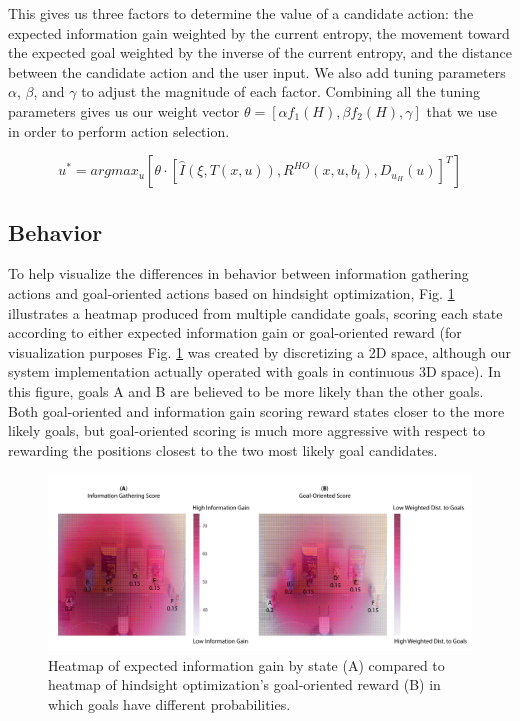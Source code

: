 \documentclass[conference]{IEEEtran}
\begin{document}
This gives us three factors to determine the value of a candidate action: the expected information gain weighted by the current entropy, the movement toward the expected goal weighted by the inverse of the current entropy, and the distance between the candidate action and the user input. We also add tuning parameters $\alpha$, $\beta$, and $\gamma$ to adjust the magnitude of each factor. Combining all the tuning parameters gives us our weight vector $\theta = [\alpha f_1(H), \beta f_2(H), \gamma]$ that we use in order to perform action selection.

\[
u^* = argmax_u [ \theta \cdot [\hat{I}(\xi, T(x,u)), R^{HO}(x,u,b_t), D_{u_H}(u)]^T ]
\]

\subsection{Behavior}

To help visualize the differences in behavior between information gathering actions and goal-oriented actions based on hindsight optimization, Fig. \ref{heatmap2} illustrates a heatmap produced from multiple candidate goals, scoring each state according to either expected information gain or goal-oriented reward (for visualization purposes Fig. \ref{heatmap2} was created by discretizing a 2D space, although our system implementation actually operated with goals in continuous 3D space). In this figure, goals A and B are believed to be more likely than the other goals. Both goal-oriented and information gain scoring reward states closer to the more likely goals, but goal-oriented scoring is much more aggressive with respect to rewarding the positions closest to the two most likely goal candidates.

\begin{figure}
\includegraphics[width=\columnwidth]{figures/Heatmap_Uneven_Belief.pdf}
\caption{Heatmap of expected information gain by state (A) compared to heatmap of hindsight optimization's goal-oriented reward (B) in which goals have different probabilities.}
\label{heatmap2}
\end{figure}
\end{document}
